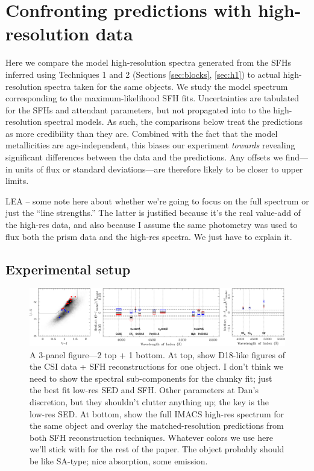 \documentclass[a4paper,fleqn,usenatbib]{mnras}
\newcommand{\bfb}{\color{myblue}}
\begin{document}
\section{Confronting predictions with high-resolution data}
\label{sec:results}

Here we compare the model high-resolution spectra generated from the SFHs inferred using 
Techniques 1 and 2 (Sections \ref{sec:blocks}, \ref{sec:h1}) to actual high-resolution spectra taken for
the same objects. We study the model spectrum corresponding to
the maximum-likelihood SFH fits. Uncertainties are tabulated for the SFHs and attendant 
parameters, but not propagated into to the high-resolution spectral models. As such,
the comparisons below treat the predictions as more credibility than they are. Combined with the fact 
that the model metallicities are age-independent, this biases our experiment {\it towards} 
revealing significant differences between the data and the predictions. Any offsets we find---in units
of flux or standard deviations---are therefore likely to be closer to upper limits. %

{\bfb LEA -- some note here about whether we're going to focus on the full spectrum or just the ``line
strengths.'' The latter is justified because it's the real value-add of the high-res data, and also because
I assume the same photometry was used to flux both the prism data and the high-res spectra. We
just have to explain it.}

\subsection{Experimental setup}

\begin{figure}[t!]
	\includegraphics[width=\textwidth]{residuals}
	\caption{\bfb A 3-panel figure---2 top + 1 bottom. At top, show D18-like figures of the CSI
			data + SFH reconstructions for one object. I don't think we need to show the spectral
			sub-components for the chunky fit; just the best fit low-res SED and SFH. Other parameters
			at Dan's discretion, but they shouldn't clutter anything up; the key is the low-res SED.
			At bottom, show the full IMACS high-res spectrum for the same object and overlay the
			matched-resolution predictions from both SFH reconstruction techniques. Whatever
			colors we use here we'll stick with for the rest of the paper. The object probably should
			be like SA-type; nice absorption, some emission.}
	\label{fig:scheme}
\end{figure}
\end{document}
